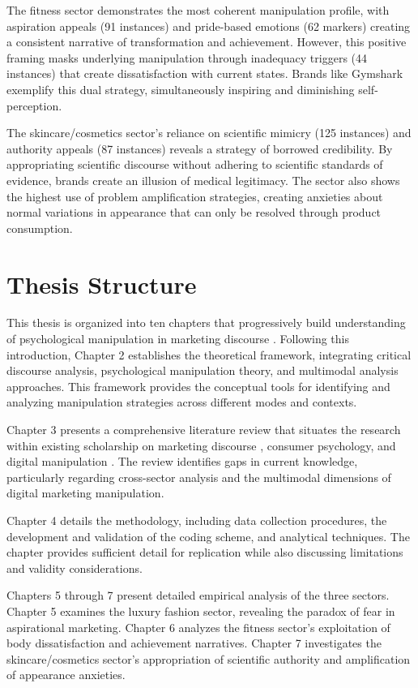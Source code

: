 The fitness sector demonstrates the most coherent manipulation profile, with aspiration appeals (91 instances) and pride-based emotions (62 markers) creating a consistent narrative of transformation and achievement. However, this positive framing masks underlying manipulation through inadequacy triggers (44 instances) that create dissatisfaction with current states. Brands like Gymshark exemplify this dual strategy, simultaneously inspiring and diminishing self-perception.

The skincare/cosmetics sector's reliance on scientific mimicry (125 instances) and authority appeals (87 instances) reveals a strategy of borrowed credibility. By appropriating scientific discourse without adhering to scientific standards of evidence, brands create an illusion of medical legitimacy. The sector also shows the highest use of problem amplification strategies, creating anxieties about normal variations in appearance that can only be resolved through product consumption.

\section{Thesis Structure}
\label{sec:thesis_structure}

This thesis is organized into ten chapters that progressively build understanding of psychological manipulation in marketing discourse \cite{fairclough2015language}. Following this introduction, Chapter 2 establishes the theoretical framework, integrating critical discourse analysis, psychological manipulation theory, and multimodal analysis approaches. This framework provides the conceptual tools for identifying and analyzing manipulation strategies across different modes and contexts.

Chapter 3 presents a comprehensive literature review that situates the research within existing scholarship on marketing discourse \cite{fairclough2015language}, consumer psychology, and digital manipulation \cite{calo2014digital}. The review identifies gaps in current knowledge, particularly regarding cross-sector analysis and the multimodal dimensions of digital marketing manipulation.

Chapter 4 details the methodology, including data collection procedures, the development and validation of the coding scheme, and analytical techniques. The chapter provides sufficient detail for replication while also discussing limitations and validity considerations.

Chapters 5 through 7 present detailed empirical analysis of the three sectors. Chapter 5 examines the luxury fashion sector, revealing the paradox of fear in aspirational marketing. Chapter 6 analyzes the fitness sector's exploitation of body dissatisfaction and achievement narratives. Chapter 7 investigates the skincare/cosmetics sector's appropriation of scientific authority and amplification of appearance anxieties.

